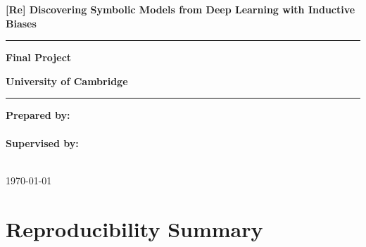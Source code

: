 \documentclass{article}
\begin{document}
\begin{titlepage}
    \centering
    
    \vspace*{\fill}
    
    \textbf{\LARGE [Re] Discovering Symbolic Models from Deep Learning with Inductive Biases}\\
    \vspace{0.5cm}
    \hrule %
    \vspace{0.5cm}
    \textbf{\Large Final Project}
    
    \vspace{3cm}
    
    \textbf{University of Cambridge}\\
    \hrule %
    \vspace{0.5cm}
    
    \vspace{0.5cm}
    
    \textbf{Prepared by:}\\
    \\
    \vspace{0.5cm}
    \textbf{Supervised by:}\\
    \\
    \vspace{0.5cm}
    \vspace{1cm}
    
    \today
    
    \vspace*{\fill}
\end{titlepage}

\newpage %
\section{Reproducibility Summary}
\end{document}
